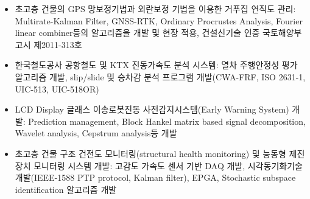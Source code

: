 \documentclass[10pt,a4paper,ragged2e]{altacv}
\begin{document}
\divider

\begin{itemize}
\item 초고층 건물의 GPS 망보정기법과 외란보정 기법을 이용한 거푸집 연직도 관리: Multirate-Kalman Filter, GNSS-RTK, Ordinary Procrustes Analysis, Fourier linear combiner등의 알고리즘을 개발 및 현장 적용, 건설신기술 인증 국토해양부고시 제2011-313호
\item 한국철도공사 공항철도 및 KTX 진동가속도 분석 시스템: 열차 주행안정성 평가 알고리즘 개발, slip/slide 및 승차감 분석 프로그램 개발(CWA-FRF, ISO 2631-1, UIC-513, UIC-518OR)
\item LCD Display 글래스 이송로봇진동 사전감지시스템(Early Warning System) 개발: Prediction management, Block Hankel matrix based signal decomposition, Wavelet analysis, Cepstrum analysis등 개발
\item 초고층 건물 구조 건전도 모니터링(structural health monitoring) 및 능동형 제진장치 모니터링 시스템 개발: 고감도 가속도 센서 기반 DAQ 개발, 시각동기화기술 개발(IEEE-1588 PTP protocol, Kalman filter), EPGA, Stochastic subspace identification 알고리즘 개발
\end{itemize}

\divider


%


\end{document}
